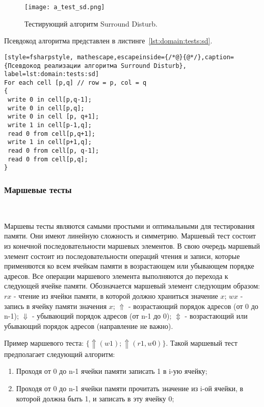 \begin{figure}[ht]
\centering
  \texttt{[image: a\_test\_sd.png]}  
  \caption{ Тестирующий алгоритм Surround Disturb. }
  \label{fig:domain:tests:sd}
\end{figure} 

Псевдокод алгоритма представлен в листинге~\ref{lst:domain:tests:sd}.

\begin{lstlisting}[style=fsharpstyle, mathescape,escapeinside={/*@}{@*/},caption={Псевдокод реализации алгоритма Surround Disturb}, label=lst:domain:tests:sd]
For each cell [p,q] // row = p, col = q
{
 write 0 in cell[p,q-1];
 write 0 in cell[p,q];
 write 0 in cell [p, q+1];
 write 1 in cell[p-1,q];
 read 0 from cell[p,q+1];
 write 1 in cell[p+1,q];
 read 0 from cell[p, q-1];
 read 0 from cell[p,q];
}
\end{lstlisting}

\subsubsection{Маршевые тесты}~\\
\label{sub:domain:tests:march}

Маршевы тесты являются самыми простыми и оптимальными для тестирования памяти. Они имеют линейную сложность и симметрию.
Маршевый тест состоит из конечной последовательности маршевых элементов. В свою очередь маршевый элемент состоит из последовательности операций чтения и записи, которые применяются ко всем ячейкам памяти в возрастающем или убывающем порядке адресов.
Все операции маршевого элемента выполняются до перехода к следующей ячейке памяти.
Обозначается маршевый элемент следующим образом: $rx$ - чтение из ячейки памяти, в которой должно храниться значение $x$; $wx$ - запись в ячейку памяти значения $x$; $\Uparrow$ - возрастающий порядок адресов (от 0 до n-1); $\Downarrow$ - убывающий порядок адресов (от n-1 до 0); $\Updownarrow$ - возрастающий или убывающий порядок адресов (направление не важно). 

Пример маршевого теста: $\{\Uparrow (w1); \Uparrow (r1,w0)\}$. Такой маршевый тест предполагает следующий алгоритм:

\begin{enumerate}
\item Проходя от 0 до n-1 ячейки памяти записать 1 в i-ую ячейку;
\item Проходя от 0 до n-1 ячейки памяти прочитать значение из i-ой ячейки, в которой должна быть 1, и записать в эту ячейку 0;
\end{enumerate}

